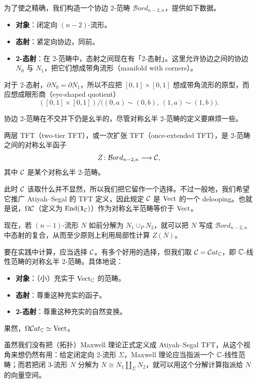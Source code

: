
为了使之精确，我们构造一个协边 2-范畴 $\mathcal{B}ord_{n-2,n}$，提供如下数据。
\begin{itemize}
  \item \textbf{对象}：闭定向 $(n-2)$-流形。
  \item \textbf{态射}：紧定向协边，同前。
  \item \textbf{2-态射}：在 2-范畴中，态射之间现在有「2-态射」。这里允许协边之间的协边 $N_0$ 与 $N_1$，把它们想成带角流形（manifold with corners）。
\end{itemize}
对于 2-态射，$\partial N_0=\partial N_1$，所以不应把 $[0,1]\times[0,1]$ 想成带角流形的原型，而应想成眼形商（eye-shaped quotient）
\[
  ([0,1]\times[0,1])\big/\bigl((0,a)\sim(0,b),\ (1,a)\sim(1,b)\bigr).
\]

协边 2-范畴在不交并下仍是幺半的，尽管对称幺半 2-范畴的定义要麻烦一些。

\begin{definition}
  两层 TFT（two-tier TFT），或一次扩张 TFT（once-extended TFT），是 2-范畴之间的对称幺半函子
  \[
    Z\colon \mathcal{B}ord_{n-2,n}\longrightarrow \mathcal{C},
  \]
  其中 $\mathcal{C}$ 是某个对称幺半 2-范畴。
\end{definition}

此时 $\mathcal{C}$ 该取什么并不显然，所以我们把它留作一个选择。不过一般地，我们希望它推广 Atiyah–Segal 的 TFT 定义，因此规定 $\mathcal{C}$ 是 $\mathrm{Vect}$ 的一个 delooping。也就是说，$\Omega\mathcal{C}$（定义为 $\operatorname{End}(\mathbf{1}_{\mathcal{C}})$）作为对称幺半范畴等价于 $\mathrm{Vect}$。

现在，若 $(n-1)$-流形 $N$ 如前分解为 $N_1\cup_P N_2$，就可以把 $N$ 写成 $\mathcal{B}ord_{n-2,n}$ 中态射的复合，从而至少原则上利用局部性计算 $Z(N)$。

要在实践中计算，应当选择 $\mathcal{C}$。有多个好用的选择，但我们取 $\mathcal{C}=\mathcal{C}at_{\mathbb{C}}$，即 $\mathbb{C}$-线性范畴的对称幺半 2-范畴。具体地说：
\begin{itemize}
  \item \textbf{对象}：（小）充实于 $\mathrm{Vect}_{\mathbb{C}}$ 的范畴。
  \item \textbf{态射}：尊重这种充实的函子。
  \item \textbf{2-态射}：尊重这种充实的自然变换。
\end{itemize}
果然，$\Omega\mathcal{C}at_{\mathbb{C}}\simeq\mathrm{Vect}$。

虽然我们没有把（拓扑）Maxwell 理论正式定义成 Atiyah–Segal TFT，从这个视角来想仍然有用：给定闭定向 2-流形 $\Sigma$，Maxwell 理论应当指派一个 $\mathbb{C}$-线性范畴；而若把闭 3-流形 $N$ 分解为 $N\cong N_1\amalg_\Sigma N_2$，就可以用这个分解计算指派给 $N$ 的向量空间。

